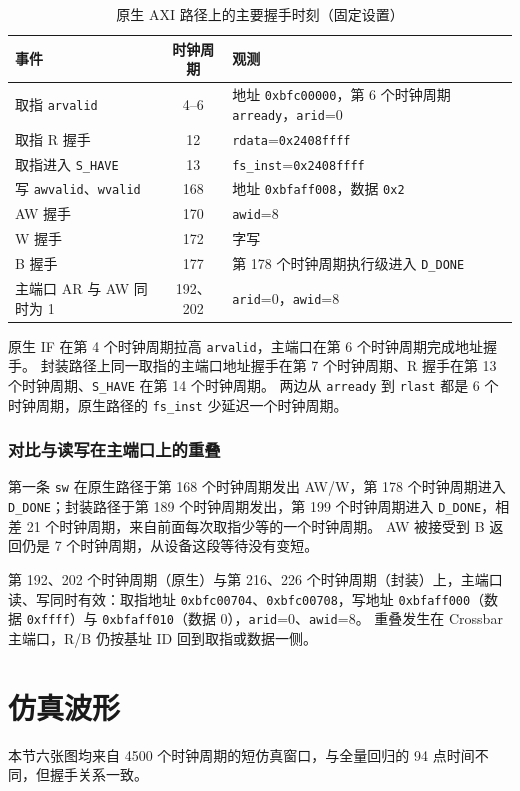 \documentclass{article}
\begin{document}
\begin{table}[H]
\centering
\small
\caption{原生 AXI 路径上的主要握手时刻（固定设置）}
\begin{tabular}{@{}p{}cp{}@{}}
\toprule
事件 & 时钟周期 & 观测 \\
\midrule
取指 \texttt{arvalid} & 4--6 & 地址 \texttt{0xbfc00000}，第 6 个时钟周期 \texttt{arready}，\texttt{arid}=0 \\
取指 R 握手 & 12 & \texttt{rdata}=\texttt{0x2408ffff} \\
取指进入 \texttt{S\_HAVE} & 13 & \texttt{fs\_inst}=\texttt{0x2408ffff} \\
写 \texttt{awvalid}、\texttt{wvalid} & 168 & 地址 \texttt{0xbfaff008}，数据 \texttt{0x2} \\
AW 握手 & 170 & \texttt{awid}=8 \\
W 握手 & 172 & 字写 \\
B 握手 & 177 & 第 178 个时钟周期执行级进入 \texttt{D\_DONE} \\
主端口 AR 与 AW 同时为 1 & 192、202 & \texttt{arid}=0，\texttt{awid}=8 \\
\bottomrule
\end{tabular}
\end{table}

原生 IF 在第 4 个时钟周期拉高 \texttt{arvalid}，主端口在第 6 个时钟周期完成地址握手。
封装路径上同一取指的主端口地址握手在第 7 个时钟周期、R 握手在第 13 个时钟周期、\texttt{S\_HAVE} 在第 14 个时钟周期。
两边从 \texttt{arready} 到 \texttt{rlast} 都是 6 个时钟周期，原生路径的 \texttt{fs\_inst} 少延迟一个时钟周期。

\subsubsection{对比与读写在主端口上的重叠}
第一条 \texttt{sw} 在原生路径于第 168 个时钟周期发出 AW/W，第 178 个时钟周期进入 \texttt{D\_DONE}；封装路径于第 189 个时钟周期发出，第 199 个时钟周期进入 \texttt{D\_DONE}，相差 21 个时钟周期，来自前面每次取指少等的一个时钟周期。
AW 被接受到 B 返回仍是 7 个时钟周期，从设备这段等待没有变短。

第 192、202 个时钟周期（原生）与第 216、226 个时钟周期（封装）上，主端口读、写同时有效：取指地址 \texttt{0xbfc00704}、\texttt{0xbfc00708}，写地址 \texttt{0xbfaff000}（数据 \texttt{0xffff}）与 \texttt{0xbfaff010}（数据 0），\texttt{arid}=0、\texttt{awid}=8。
重叠发生在 Crossbar 主端口，R/B 仍按基址 ID 回到取指或数据一侧。

\section{仿真波形}
本节六张图均来自 4500 个时钟周期的短仿真窗口，与全量回归的 94 点时间不同，但握手关系一致。
\end{document}
